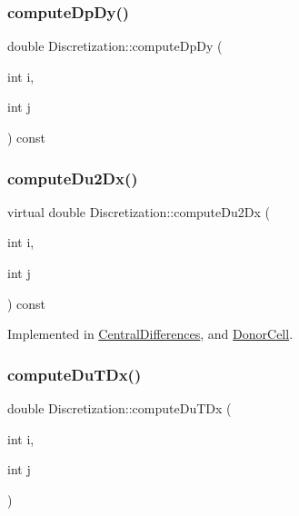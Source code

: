 \subsubsection{\texorpdfstring{computeDpDy()}{computeDpDy()}}
{\footnotesize\ttfamily double Discretization\+::compute\+Dp\+Dy (\begin{DoxyParamCaption}\item[{int}]{i,  }\item[{int}]{j }\end{DoxyParamCaption}) const\hspace{0.3cm}{\ttfamily [virtual]}}

\mbox{\label{classDiscretization_acca6bf193e0e91f645d292527299254b}} 
\subsubsection{\texorpdfstring{computeDu2Dx()}{computeDu2Dx()}}
{\footnotesize\ttfamily virtual double Discretization\+::compute\+Du2\+Dx (\begin{DoxyParamCaption}\item[{int}]{i,  }\item[{int}]{j }\end{DoxyParamCaption}) const\hspace{0.3cm}{\ttfamily [pure virtual]}}



Implemented in \mbox{\hyperlink{classCentralDifferences_abd31168fd39ed2d61f3459a9aa030204}{Central\+Differences}}, and \mbox{\hyperlink{classDonorCell_a191338f4c9d03f2fcf202ab865f28446}{Donor\+Cell}}.

\mbox{\label{classDiscretization_a597dfac7c819b87175f1ba6a88ea56bd}} 
\subsubsection{\texorpdfstring{computeDuTDx()}{computeDuTDx()}}
{\footnotesize\ttfamily double Discretization\+::compute\+Du\+T\+Dx (\begin{DoxyParamCaption}\item[{int}]{i,  }\item[{int}]{j }\end{DoxyParamCaption})}

